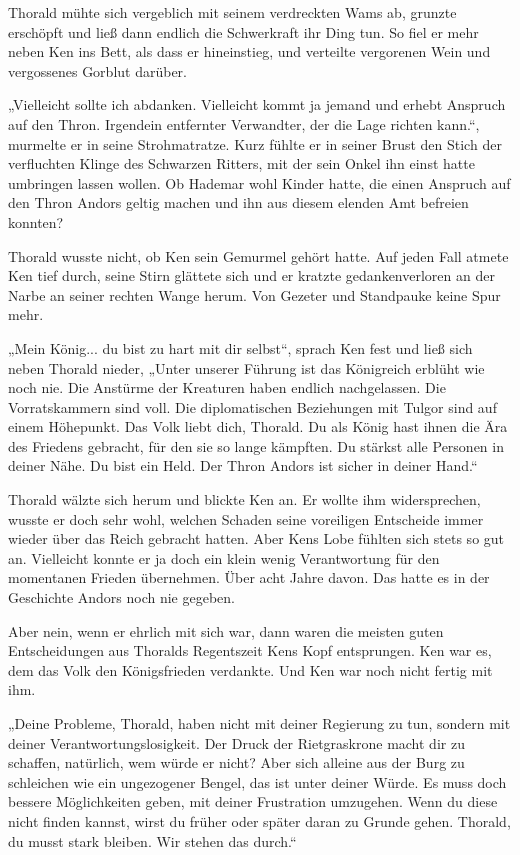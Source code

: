 \documentclass[10pt, a4paper, oneside]{book}
\begin{document}
Thorald mühte sich vergeblich mit seinem verdreckten Wams ab, grunzte erschöpft und ließ dann endlich die Schwerkraft ihr Ding tun. So fiel er mehr neben Ken ins Bett, als dass er hineinstieg, und verteilte vergorenen Wein und vergossenes Gorblut darüber.

„Vielleicht sollte ich abdanken. Vielleicht kommt ja jemand und erhebt Anspruch auf den Thron. Irgendein entfernter Verwandter, der die Lage richten kann.“, murmelte er in seine Strohmatratze. Kurz fühlte er in seiner Brust den Stich der verfluchten Klinge des Schwarzen Ritters, mit der sein Onkel ihn einst hatte umbringen lassen wollen. Ob Hademar wohl Kinder hatte, die einen Anspruch auf den Thron Andors geltig machen und ihn aus diesem elenden Amt befreien konnten?

Thorald wusste nicht, ob Ken sein Gemurmel gehört hatte. Auf jeden Fall atmete Ken tief durch, seine Stirn glättete sich und er kratzte gedankenverloren an der Narbe an seiner rechten Wange herum. Von Gezeter und Standpauke keine Spur mehr.

„Mein König... du bist zu hart mit dir selbst“, sprach Ken fest und ließ sich neben Thorald nieder, „Unter unserer Führung ist das Königreich erblüht wie noch nie. Die Anstürme der Kreaturen haben endlich nachgelassen. Die Vorratskammern sind voll. Die diplomatischen Beziehungen mit Tulgor sind auf einem Höhepunkt. Das Volk liebt dich, Thorald. Du als König hast ihnen die Ära des Friedens gebracht, für den sie so lange kämpften. Du stärkst alle Personen in deiner Nähe. Du bist ein Held. Der Thron Andors ist sicher in deiner Hand.“

Thorald wälzte sich herum und blickte Ken an. Er wollte ihm widersprechen, wusste er doch sehr wohl, welchen Schaden seine voreiligen Entscheide immer wieder über das Reich gebracht hatten. Aber Kens Lobe fühlten sich stets so gut an. Vielleicht konnte er ja doch ein klein wenig Verantwortung für den momentanen Frieden übernehmen. Über acht Jahre davon. Das hatte es in der Geschichte Andors noch nie gegeben.

Aber nein, wenn er ehrlich mit sich war, dann waren die meisten guten Entscheidungen aus Thoralds Regentszeit Kens Kopf entsprungen. Ken war es, dem das Volk den Königsfrieden verdankte. Und Ken war noch nicht fertig mit ihm.

„Deine Probleme, Thorald, haben nicht mit deiner Regierung zu tun, sondern mit deiner Verantwortungslosigkeit. Der Druck der Rietgraskrone macht dir zu schaffen, natürlich, wem würde er nicht? Aber sich alleine aus der Burg zu schleichen wie ein ungezogener Bengel, das ist unter deiner Würde. Es muss doch bessere Möglichkeiten geben, mit deiner Frustration umzugehen. Wenn du diese nicht finden kannst, wirst du früher oder später daran zu Grunde gehen. Thorald, du musst stark bleiben. Wir stehen das durch.“
\end{document}
